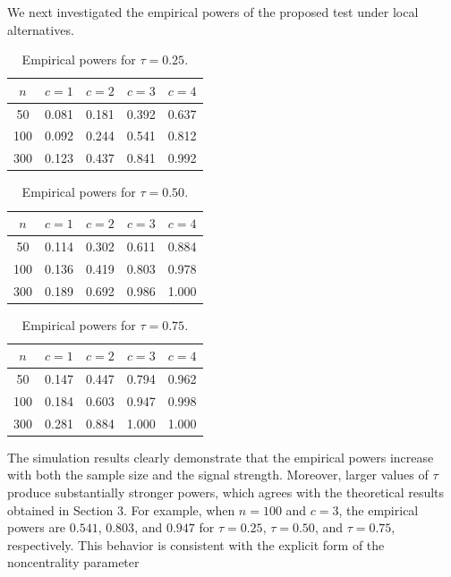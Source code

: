 \documentclass[twoside]{article}
\begin{document}
We next investigated the empirical powers of the proposed test under local alternatives.

\begin{table}[h]
	\begin{center}
		\small
		\caption{Empirical powers for $\tau=0.25$.}\label{tab2}
		\begin{tabular}{|c|c|c|c|c|}
			\hline
			$n$ & $c=1$ & $c=2$ & $c=3$ & $c=4$ \\ \hline \hline
			50  & 0.081 & 0.181 & 0.392 & 0.637 \\
			100 & 0.092 & 0.244 & 0.541 & 0.812 \\
			300 & 0.123 & 0.437 & 0.841 & 0.992 \\ \hline
			\end{tabular}
		\end{center}
	\end{table}

\begin{table}[h]
\begin{center}
\small
\caption{Empirical powers for $\tau=0.50$.}\label{tab3}
\begin{tabular}{|c|c|c|c|c|}
\hline
$n$ & $c=1$ & $c=2$ & $c=3$ & $c=4$ \\ \hline \hline
50  & 0.114 & 0.302 & 0.611 & 0.884 \\
100 & 0.136 & 0.419 & 0.803 & 0.978 \\
300 & 0.189 & 0.692 & 0.986 & 1.000 \\ \hline
\end{tabular}
\end{center}
\end{table}

\begin{table}[h]
\begin{center}
\small
\caption{Empirical powers for $\tau=0.75$.}\label{tab4}
\begin{tabular}{|c|c|c|c|c|}
\hline
$n$ & $c=1$ & $c=2$ & $c=3$ & $c=4$ \\ \hline \hline
50  & 0.147 & 0.447 & 0.794 & 0.962 \\
100 & 0.184 & 0.603 & 0.947 & 0.998 \\
300 & 0.281 & 0.884 & 1.000 & 1.000 \\ \hline
\end{tabular}
\end{center}
\end{table}

The simulation results clearly demonstrate that the empirical powers increase with both the sample size and the signal strength. Moreover, larger values of $\tau$ produce substantially stronger powers, which agrees with the theoretical results obtained in Section 3. For example, when $n=100$ and $c=3$, the empirical powers are $0.541$, $0.803$, and $0.947$ for $\tau=0.25$, $\tau=0.50$, and $\tau=0.75$, respectively. This behavior is consistent with the explicit form of the noncentrality parameter
\end{document}
